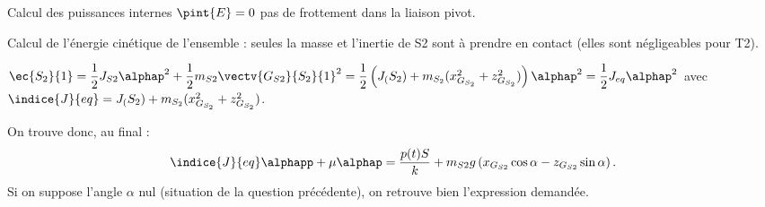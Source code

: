 \begin{corrige}
	Calcul des puissances internes $\pint{E}=0$ pas de frottement dans la liaison pivot.

	Calcul de l'énergie cinétique de l'ensemble : seules la masse et l’inertie de S2 sont à prendre en contact (elles sont négligeables pour T2). 
	
	$\ec{S_2}{1}=\dfrac{1}{2} J_{S2}\alphap^2+\dfrac{1}{2} m_{S2} \vectv{G_{S2}}{S_2}{1}^2=\dfrac{1}{2} \left(J_(S_2 )+m_{S_2} (x_{G_{S_2}}^2+z_{G_{S_2}}^2 )\right) \alphap^2 =\dfrac{1}{2} J_{eq} \alphap^2$
avec $\indice{J}{eq}=J_(S_2 )+m_{S_2} (x_{G_{S_2}}^2+z_{G_{S_2}}^2 )$. 

On trouve donc, au final :
 $$\indice{J}{eq} \alphapp + \mu \alphap =\dfrac{p(t)S}{k}+m_{S2} g\left( x_{G_{S2}}   \cos \alpha-z_{G_{S2}}  \sin\alpha\right) .$$
Si on suppose l'angle $\alpha$ nul (situation de la question précédente), on retrouve bien l'expression demandée.


\end{corrige}
\else
\fi

	
